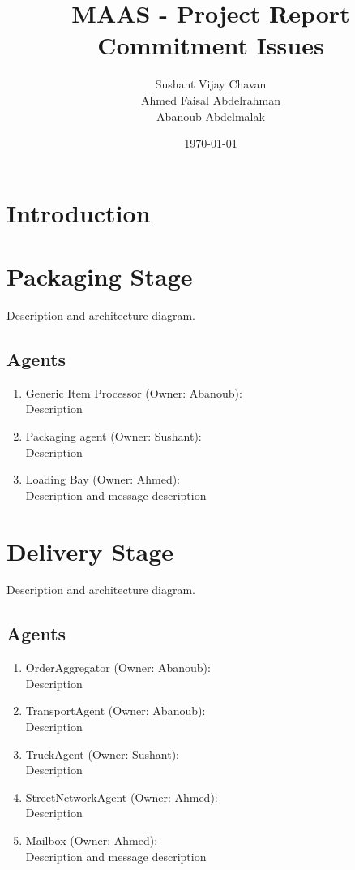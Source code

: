\documentclass[11pt, a4paper]{article}
\title{MAAS - Project Report \\Commitment Issues}
\author{Sushant Vijay Chavan\\Ahmed Faisal Abdelrahman\\Abanoub Abdelmalak}
\date{\today}
\begin{document}
\maketitle
\newpage
\newpage

\section{Introduction}

\section{Packaging Stage}
Description and architecture diagram.

\subsection{Agents}
\begin{enumerate}
	\item Generic Item Processor (Owner: Abanoub):\\
	Description
	\item Packaging agent (Owner: Sushant):\\
	Description
	\item Loading Bay (Owner: Ahmed):\\
	Description and message description
\end{enumerate}

\section{Delivery Stage}
Description and architecture diagram.

\subsection{Agents}
\begin{enumerate}
	\item OrderAggregator (Owner: Abanoub):\\
	Description
	\item TransportAgent (Owner: Abanoub):\\
	Description
	\item TruckAgent (Owner: Sushant):\\
	Description
	\item StreetNetworkAgent (Owner: Ahmed):\\
	Description
	\item Mailbox (Owner: Ahmed):\\
	Description and message description
\end{enumerate}
\end{document}
